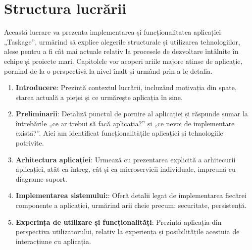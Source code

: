 \section{Structura lucrării}

Această lucrare va prezenta implementarea și funcționalitatea aplicației „Taskage”, urmărind să explice alegerile structurale și utilizarea tehnologiilor, alese pentru a fi cât mai actuale relativ la procesele de dezvoltare întâlnite în echipe și proiecte mari. Capitolele vor acoperi ariile majore atinse de aplicație, pornind de la o perspectivă la nivel înalt și urmând prin a le detalia.
\begin{enumerate}
 	 \item \textbf{Introducere}: Prezintă contextul lucrării, incluzând motivația din spate, starea actuală a pieței și ce urmărește aplicația în sine.
	\item \textbf{Preliminarii}: Detaliză punctul de pornire al aplicației și răspunde sumar la întrebările „ce ar trebui să facă aplicația?” și „ce nevoi de implementare există?”.  Aici am identificat funcționalitățile aplicației și tehnologiile potrivite. 
	\item \textbf{Arhitectura aplicației}: Urmează cu prezentarea explicită a arhitecurii aplicației, atât ca întreg, cât și ca microservicii individuale, impreună cu diagrame suport.
	\item \textbf{Implementarea sistemului:}: Oferă detalii legat de implementarea fiecărei componente a aplicației, urmărind arii cheie precum: securitate, persistență.
	\item \textbf{Experința de utilizare și funcționalități}: Prezintă aplicația din perspectiva utilizatorului, relativ la experiența și posibilitățile acestuia de interacțiune cu aplicația.
\end{enumerate}